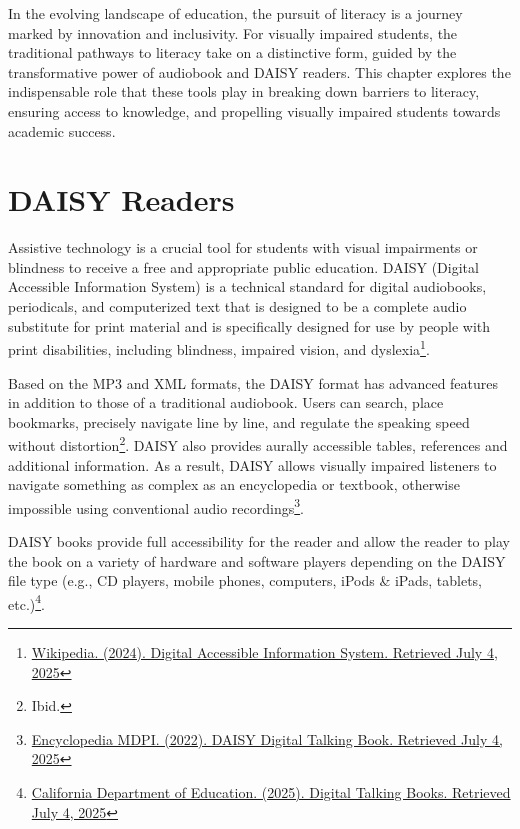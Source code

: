 In the evolving landscape of education, the pursuit of literacy is a journey marked by innovation and inclusivity. For visually impaired students, the traditional pathways to literacy take on a distinctive form, guided by the transformative power of audiobook and DAISY readers. This chapter explores the indispensable role that these tools play in breaking down barriers to literacy, ensuring access to knowledge, and propelling visually impaired students towards academic success.

\section{DAISY Readers}\label{text-to-speech-music-podcast}

Assistive technology is a crucial tool for students with visual impairments or blindness to receive a free and appropriate public education. DAISY (Digital Accessible Information System) is a technical standard for digital audiobooks, periodicals, and computerized text that is designed to be a complete audio substitute for print material and is specifically designed for use by people with print disabilities, including blindness, impaired vision, and dyslexia\footnote{\href{https://en.wikipedia.org/wiki/Digital_Accessible_Information_System}{Wikipedia. (2024). Digital Accessible Information System. Retrieved July 4, 2025}}.

Based on the MP3 and XML formats, the DAISY format has advanced features in addition to those of a traditional audiobook. Users can search, place bookmarks, precisely navigate line by line, and regulate the speaking speed without distortion\footnote{Ibid.}. DAISY also provides aurally accessible tables, references and additional information. As a result, DAISY allows visually impaired listeners to navigate something as complex as an encyclopedia or textbook, otherwise impossible using conventional audio recordings\footnote{\href{https://encyclopedia.pub/entry/33638}{Encyclopedia MDPI. (2022). DAISY Digital Talking Book. Retrieved July 4, 2025}}.

DAISY books provide full accessibility for the reader and allow the reader to play the book on a variety of hardware and software players depending on the DAISY file type (e.g., CD players, mobile phones, computers, iPods \& iPads, tablets, etc.)\footnote{\href{https://www.cde.ca.gov/re/pn/sm/dtbdefinitions.asp}{California Department of Education. (2025). Digital Talking Books. Retrieved July 4, 2025}}.

